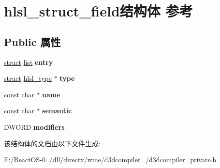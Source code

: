 \hypertarget{structhlsl__struct__field}{}\section{hlsl\+\_\+struct\+\_\+field结构体 参考}
\label{structhlsl__struct__field}
\subsection*{Public 属性}
\begin{DoxyCompactItemize}
\item 
\mbox{\label{structhlsl__struct__field_aca710494c76ab32310de21f87041b4b8}} 
\hyperlink{interfacestruct}{struct} \hyperlink{classlist}{list} {\bfseries entry}
\item 
\mbox{\label{structhlsl__struct__field_a285eb16423b8ee7569eeb0a034a06a3d}} 
\hyperlink{interfacestruct}{struct} \hyperlink{structhlsl__type}{hlsl\+\_\+type} $\ast$ {\bfseries type}
\item 
\mbox{\label{structhlsl__struct__field_a08cac2248ee3ca6165cf2f9a87fc619d}} 
const char $\ast$ {\bfseries name}
\item 
\mbox{\label{structhlsl__struct__field_ab8386421b3e02679327c7840973c163c}} 
const char $\ast$ {\bfseries semantic}
\item 
\mbox{\label{structhlsl__struct__field_a0fc3715826adce80f1795b6eec9e09a6}} 
D\+W\+O\+RD {\bfseries modifiers}
\end{DoxyCompactItemize}


该结构体的文档由以下文件生成\+:\begin{DoxyCompactItemize}
\item 
E\+:/\+React\+O\+S-\/0../dll/directx/wine/d3dcompiler\+\_/d3dcompiler\+\_\+private.\+h\end{DoxyCompactItemize}
